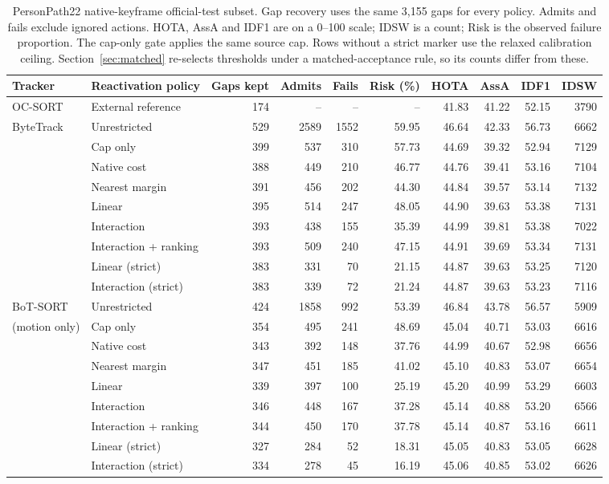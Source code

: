 

\begin{table}[t]
\centering
\small
\caption{PersonPath22 native-keyframe official-test subset. Gap recovery
uses the same 3,155 gaps for every policy. Admits and fails exclude
ignored actions. HOTA, AssA and IDF1 are on a 0--100 scale; IDSW is a
count; Risk is the observed failure proportion. The cap-only gate applies
the same source cap. Rows without a strict marker use the relaxed
calibration ceiling. Section~\ref{sec:matched} re-selects thresholds under
a matched-acceptance rule, so its counts differ from these.}
\label{tab:reconnection-main}
\begin{tabular}{llrrrrrrrr}
\hline
Tracker & Reactivation policy & Gaps kept & Admits & Fails & Risk (\%) & HOTA & AssA & IDF1 & IDSW \\
\hline
OC-SORT & External reference & 174 & -- & -- & -- & 41.83 & 41.22 & 52.15 & 3790 \\
\hline
ByteTrack & Unrestricted & 529 & 2589 & 1552 & 59.95 & 46.64 & 42.33 & 56.73 & 6662 \\
 & Cap only & 399 & 537 & 310 & 57.73 & 44.69 & 39.32 & 52.94 & 7129 \\
 & Native cost & 388 & 449 & 210 & 46.77 & 44.76 & 39.41 & 53.16 & 7104 \\
 & Nearest margin & 391 & 456 & 202 & 44.30 & 44.84 & 39.57 & 53.14 & 7132 \\
 & Linear & 395 & 514 & 247 & 48.05 & 44.90 & 39.63 & 53.38 & 7131 \\
 & Interaction & 393 & 438 & 155 & 35.39 & 44.99 & 39.81 & 53.38 & 7022 \\
 & Interaction + ranking & 393 & 509 & 240 & 47.15 & 44.91 & 39.69 & 53.34 & 7131 \\
 & Linear (strict) & 383 & 331 & 70 & 21.15 & 44.87 & 39.63 & 53.25 & 7120 \\
 & Interaction (strict) & 383 & 339 & 72 & 21.24 & 44.87 & 39.63 & 53.23 & 7116 \\
\hline
BoT-SORT & Unrestricted & 424 & 1858 & 992 & 53.39 & 46.84 & 43.78 & 56.57 & 5909 \\
(motion only) & Cap only & 354 & 495 & 241 & 48.69 & 45.04 & 40.71 & 53.03 & 6616 \\
 & Native cost & 343 & 392 & 148 & 37.76 & 44.99 & 40.67 & 52.98 & 6656 \\
 & Nearest margin & 347 & 451 & 185 & 41.02 & 45.10 & 40.83 & 53.07 & 6654 \\
 & Linear & 339 & 397 & 100 & 25.19 & 45.20 & 40.99 & 53.29 & 6603 \\
 & Interaction & 346 & 448 & 167 & 37.28 & 45.14 & 40.88 & 53.20 & 6566 \\
 & Interaction + ranking & 344 & 450 & 170 & 37.78 & 45.14 & 40.87 & 53.16 & 6611 \\
 & Linear (strict) & 327 & 284 & 52 & 18.31 & 45.05 & 40.83 & 53.05 & 6628 \\
 & Interaction (strict) & 334 & 278 & 45 & 16.19 & 45.06 & 40.85 & 53.02 & 6626 \\
\hline
\end{tabular}
\end{table}

